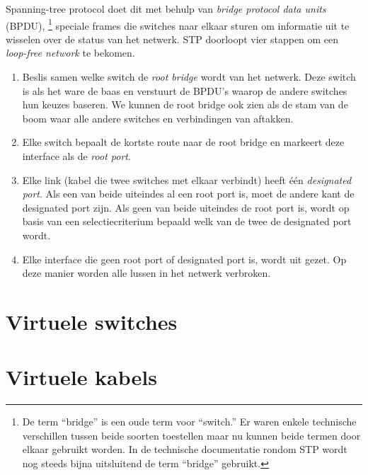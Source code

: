 Spanning-tree protocol doet dit met behulp van \emph{bridge protocol data units} (BPDU),%
    \footnote{%
        De term ``bridge'' is een oude term voor ``switch.''
        Er waren enkele technische verschillen tussen beide soorten toestellen maar nu kunnen beide termen door elkaar gebruikt worden.%
        In de technische documentatie rondom STP wordt nog steeds bijna uitsluitend de term ``bridge'' gebruikt.
    }
speciale frames die switches naar elkaar sturen om informatie uit te wisselen over de status van het netwerk.
STP doorloopt vier stappen om een \emph{loop-free network} te bekomen.
\begin{enumerate}
\item
    Beslis samen welke switch de \emph{root bridge} wordt van het netwerk.
    Deze switch is als het ware de baas en verstuurt de BPDU's waarop de andere switches hun keuzes baseren.
    We kunnen de root bridge ook zien als de stam van de boom waar alle andere switches en verbindingen van aftakken.
\item
    Elke switch bepaalt de kortste route naar de root bridge en markeert deze interface als de \emph{root port}.
\item
    Elke link (kabel die twee switches met elkaar verbindt) heeft één \emph{designated port}.
    Als een van beide uiteindes al een root port is, moet de andere kant de designated port zijn.
    Als geen van beide uiteindes de root port is, wordt op basis van een selectiecriterium bepaald welk van de twee de designated port wordt.
\item
    Elke interface die geen root port of designated port is, wordt uit gezet.
    Op deze manier worden alle lussen in het netwerk verbroken.
\end{enumerate}    



\section{Virtuele switches}


\section{Virtuele kabels}

